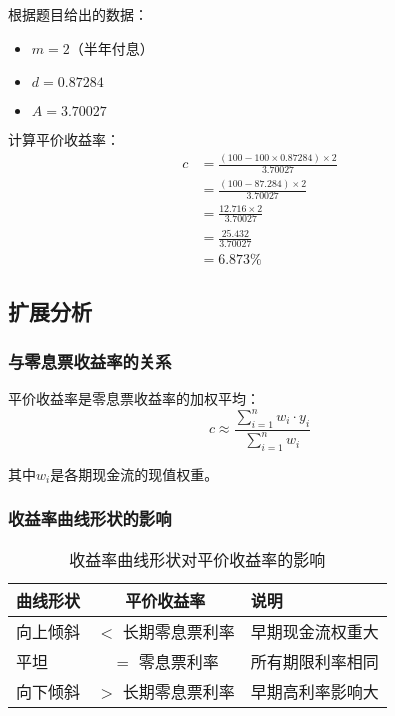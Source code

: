 根据题目给出的数据：
\begin{itemize}
    \item $m = 2$（半年付息）
    \item $d = 0.87284$
    \item $A = 3.70027$
\end{itemize}

计算平价收益率：
\begin{align}
c &= \frac{(100-100 \times 0.87284) \times 2}{3.70027} \\
&= \frac{(100-87.284) \times 2}{3.70027} \\
&= \frac{12.716 \times 2}{3.70027} \\
&= \frac{25.432}{3.70027} \\
&= 6.873\%
\end{align}

\subsection{扩展分析}

\subsubsection{与零息票收益率的关系}

平价收益率是零息票收益率的加权平均：
\begin{equation}
c \approx \frac{\sum_{i=1}^{n} w_i \cdot y_i}{\sum_{i=1}^{n} w_i}
\end{equation}

其中$w_i$是各期现金流的现值权重。

\subsubsection{收益率曲线形状的影响}

\begin{table}[H]
\centering
\caption{收益率曲线形状对平价收益率的影响}
\begin{tabular}{|l|c|l|}
\hline
\textbf{曲线形状} & \textbf{平价收益率} & \textbf{说明} \\
\hline
向上倾斜 & $<$ 长期零息票利率 & 早期现金流权重大 \\
平坦 & $=$ 零息票利率 & 所有期限利率相同 \\
向下倾斜 & $>$ 长期零息票利率 & 早期高利率影响大 \\
\hline
\end{tabular}
\end{table}

